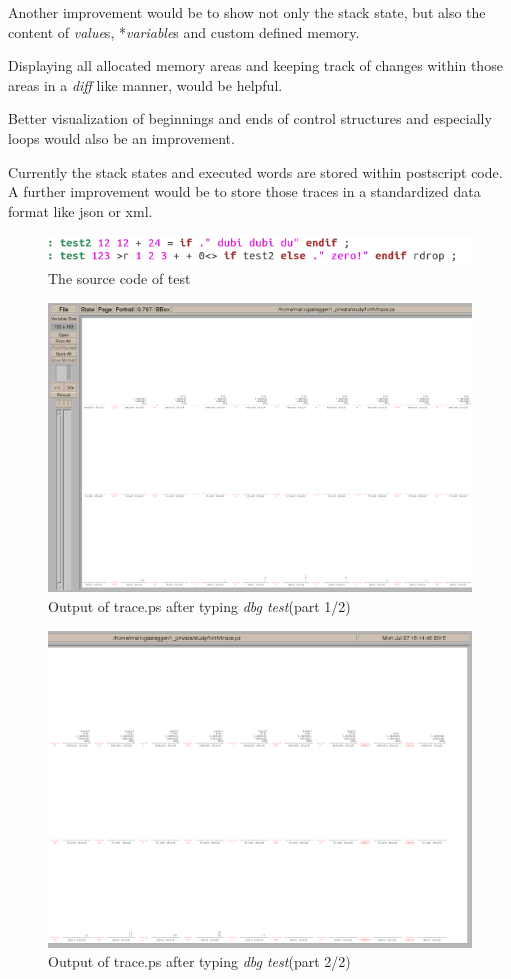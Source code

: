 Another improvement would be to show not only the stack state, but also the content of \emph{value}s, *\emph{variable}s and custom defined memory.

Displaying all allocated memory areas and keeping track of changes within those areas in a \emph{diff} like manner,  would be helpful.

Better visualization of beginnings and ends of control structures and especially loops would also be an improvement.

Currently the stack states and executed words are stored within postscript code. A further improvement would be to store those traces in a standardized data format like json or xml.

\begin{figure}[p]
    \centering
    \includegraphics[scale=0.50]{graphics/gfvis-test+test2_src.png}
    \caption{The source code of test}
    \label{fig:gfvis-test-src}
\end{figure}

\begin{figure}[p]
    \centering
    \includegraphics[scale=0.30]{graphics/traceps1.png}
    \caption{Output of trace.ps after typing \emph{dbg test}(part 1/2)}
    \label{fig:traceps1}
\end{figure}

\begin{figure}[p]
    \centering
    \includegraphics[scale=0.30]{graphics/traceps2.png}
    \caption{Output of trace.ps after typing \emph{dbg test}(part 2/2)}
    \label{fig:traceps2}
\end{figure}